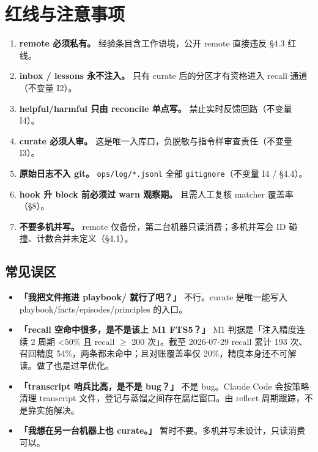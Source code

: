 \documentclass[12pt,a4paper]{ctexart}
\begin{document}
\section{红线与注意事项}

\begin{redbox}
\begin{enumerate}
  \item \textbf{remote 必须私有。} 经验条目含工作语境，公开 remote 直接违反 §4.3 红线。
  \item \textbf{inbox / lessons 永不注入。} 只有 curate 后的分区才有资格进入 recall 通道（不变量 I2）。
  \item \textbf{helpful/harmful 只由 reconcile 单点写。} 禁止实时反馈回路（不变量 I4）。
  \item \textbf{curate 必须人审。} 这是唯一入库口，负脱敏与指令样审查责任（不变量 I3）。
  \item \textbf{原始日志不入 git。} \texttt{ops/log/*.jsonl} 全部 \texttt{gitignore}（不变量 I4 / §4.4）。
  \item \textbf{hook 升 block 前必须过 warn 观察期。} 且需人工复核 matcher 覆盖率（§8）。
  \item \textbf{不要多机并写。} remote 仅备份，第二台机器只读消费；多机并写会 ID 碰撞、计数合并未定义（§4.1）。
\end{enumerate}
\end{redbox}

\subsection{常见误区}

\begin{itemize}
  \item \textbf{「我把文件拖进 playbook/ 就行了吧？」} 不行。curate 是唯一能写入 playbook/facts/episodes/principles 的入口。
  \item \textbf{「recall 空命中很多，是不是该上 M1 FTS5？」} M1 判据是「注入精度连续 2 周期 <50\% 且 recall $\geq$ 200 次」。截至 2026-07-29 recall 累计 193 次、召回精度 54\%，两条都未命中；且对账覆盖率仅 20\%，精度本身还不可解读。做了也是过早优化。
  \item \textbf{「transcript 哨兵比高，是不是 bug？」} 不是 bug。Claude Code 会按策略清理 transcript 文件，登记与蒸馏之间存在腐烂窗口。由 reflect 周期跟踪，不是靠实施解决。
  \item \textbf{「我想在另一台机器上也 curate。」} 暂时不要。多机并写未设计，只读消费可以。
\end{itemize}
\end{document}
